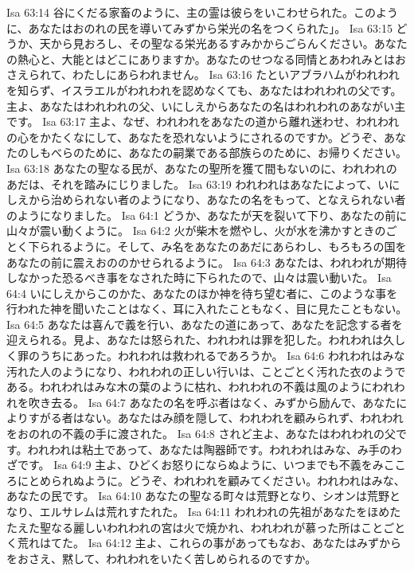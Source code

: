 Isa 63:14  谷にくだる家畜のように、主の霊は彼らをいこわせられた。このように、あなたはおのれの民を導いてみずから栄光の名をつくられた」。
Isa 63:15  どうか、天から見おろし、その聖なる栄光あるすみかからごらんください。あなたの熱心と、大能とはどこにありますか。あなたのせつなる同情とあわれみとはおさえられて、わたしにあらわれません。
Isa 63:16  たといアブラハムがわれわれを知らず、イスラエルがわれわれを認めなくても、あなたはわれわれの父です。主よ、あなたはわれわれの父、いにしえからあなたの名はわれわれのあながい主です。
Isa 63:17  主よ、なぜ、われわれをあなたの道から離れ迷わせ、われわれの心をかたくなにして、あなたを恐れないようにされるのですか。どうぞ、あなたのしもべらのために、あなたの嗣業である部族らのために、お帰りください。
Isa 63:18  あなたの聖なる民が、あなたの聖所を獲て間もないのに、われわれのあだは、それを踏みにじりました。
Isa 63:19  われわれはあなたによって、いにしえから治められない者のようになり、あなたの名をもって、となえられない者のようになりました。
Isa 64:1  どうか、あなたが天を裂いて下り、あなたの前に山々が震い動くように。
Isa 64:2  火が柴木を燃やし、火が水を沸かすときのごとく下られるように。そして、み名をあなたのあだにあらわし、もろもろの国をあなたの前に震えおののかせられるように。
Isa 64:3  あなたは、われわれが期待しなかった恐るべき事をなされた時に下られたので、山々は震い動いた。
Isa 64:4  いにしえからこのかた、あなたのほか神を待ち望む者に、このような事を行われた神を聞いたことはなく、耳に入れたこともなく、目に見たこともない。
Isa 64:5  あなたは喜んで義を行い、あなたの道にあって、あなたを記念する者を迎えられる。見よ、あなたは怒られた、われわれは罪を犯した。われわれは久しく罪のうちにあった。われわれは救われるであろうか。
Isa 64:6  われわれはみな汚れた人のようになり、われわれの正しい行いは、ことごとく汚れた衣のようである。われわれはみな木の葉のように枯れ、われわれの不義は風のようにわれわれを吹き去る。
Isa 64:7  あなたの名を呼ぶ者はなく、みずから励んで、あなたによりすがる者はない。あなたはみ顔を隠して、われわれを顧みられず、われわれをおのれの不義の手に渡された。
Isa 64:8  されど主よ、あなたはわれわれの父です。われわれは粘土であって、あなたは陶器師です。われわれはみな、み手のわざです。
Isa 64:9  主よ、ひどくお怒りにならぬように、いつまでも不義をみこころにとめられぬように。どうぞ、われわれを顧みてください。われわれはみな、あなたの民です。
Isa 64:10  あなたの聖なる町々は荒野となり、シオンは荒野となり、エルサレムは荒れすたれた。
Isa 64:11  われわれの先祖があなたをほめたたえた聖なる麗しいわれわれの宮は火で焼かれ、われわれが慕った所はことごとく荒れはてた。
Isa 64:12  主よ、これらの事があってもなお、あなたはみずからをおさえ、黙して、われわれをいたく苦しめられるのですか。
